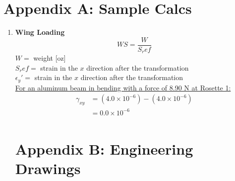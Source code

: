 \section*{Appendix A: Sample Calcs}

\begin{enumerate}[wide,label=\textbf{\arabic*}., labelindent=0pt]

    \item \textbf{Wing Loading}
        \[WS = \frac{W}{S_ref}\]
        $ W =$ weight [oz]\\
        $S_ref =$ strain in the $x$ direction after the transformation\\
        $\epsilon_y' =$ strain in the $x$ direction after the transformation\\
        
        \underline{For an aluminum beam in bending with a force of 8.90 N at Rosette 1:} \\
        \begin{align*}
            \gamma_{xy} &= (4.0 \times 10^{-6}) - (4.0 \times 10^{-6})\\
            &= 0.0 \times 10^{-6}\\
        \end{align*}
 
\section*{Appendix B: Engineering Drawings}\label{ApxB}   

\end{enumerate}